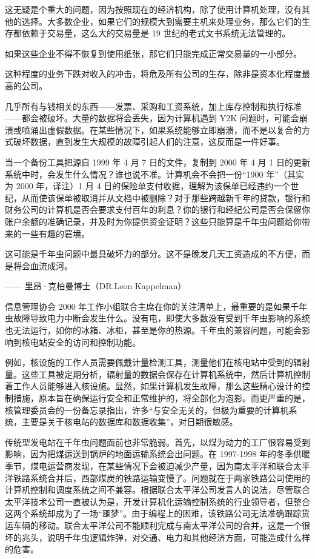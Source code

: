 这无疑是个重大的问题，因为按照现在的经济机构，除了使用计算机处理，没有其他的选择。大多数企业，如果它们的规模大到需要主机来处理业务，那么它们的生存都依赖于交易量，这么大的交易量是 19 世纪的老式文书系统无法管理的。


如果这些企业不得不恢复到使用纸张，那它们只能完成正常交易量的一小部分。


这种程度的业务下跌对收入的冲击，将危及所有公司的生存，除非是资本化程度最高的公司。


几乎所有与钱相关的东西——发票、采购和工资系统，加上库存控制和执行标准——都会被破坏。大量的数据将会丢失，因为计算机遇到 Y2K 问题时，可能会崩溃或喷涌出虚假数据。在某些情况下，如果系统能够立即崩溃，而不是以复合的方式破坏数据，直到发生大规模的故障引起人们的注意，这反而是一件好事。


当一个备份工具把源自 1999 年 4 月 7 日的文件，复制到 2000 年 4 月 1 日的更新系统中时，会发生什么情况？谁也说不准。计算机会不会把一份“1900 年”（其实为 2000 年，译注）1 月 4 日的保险单支付收据，理解为该保单已经违约一个世纪，从而使该保单被取消并从文档中被删除？对于那些跨越新千年的贷款，银行和财务公司的计算机是否会要求支付百年的利息？你的银行和经纪公司是否会保留你账户余额的准确记录，并及时为你提供资金证明？这些只能算是千年虫问题给你带来的一些有趣的窘境。


\begin{tcolorbox}
这可能是千年虫问题中最具破坏力的部分。这不是晚发几天工资造成的不方便，而是将会血流成河。
\begin{flushright}
—— 里昂·克柏曼博士（DR.Leon Kappelman）
\end{flushright}
\end{tcolorbox}

信息管理协会 2000 年工作小组联合主席在你的关注清单上，最重要的是如果千年虫故障导致电力中断会发生什么。没有电，即使大多数没有受到千年虫影响的系统也无法运行，如你的冰箱、冰柜，甚至是你的热源。千年虫的兼容问题，可能会影响到核电站安全的访问和控制功能。


例如，核设施的工作人员需要佩戴计量检测工具，测量他们在核电站中受到的辐射量。这些工具被定期分析，辐射量的数据会保存在计算机系统中，然后计算机控制着工作人员能够进入核设施。显然，如果计算机发生故障，那么这些精心设计的控制措施，原本旨在确保运行安全和正常维护的，将全部化为泡影。而更严重的是，核管理委员会的一份备忘录指出，许多“与安全无关的，但极为重要的计算机系统，主要是关于核电站的数据库和数据收集”，对日期很敏感。


传统型发电站在千年虫问题面前也非常脆弱。首先，以煤为动力的工厂很容易受到影响，因为把煤运送到锅炉的地面运输系统会出问题。在 1997-1998 年的冬季供暖季节，煤电运营商发现，在某些情况下会被迫减少产量，因为南太平洋和联合太平洋铁路系统合并后，西部煤炭的铁路运输变慢了。问题就在于两家铁路公司使用的计算机控制和调度系统之间不兼容。根据联合太平洋公司发言人的说法，尽管联合太平洋技术公司一直被认为是，开发计算机化运输控制系统的行业领导者，但整合这两个系统却成为了一场“噩梦”。由于编程上的困难，该铁路公司无法准确跟踪货运车辆的移动。联合太平洋公司不能顺利完成与南太平洋公司的合并，这是一个很坏的兆头，说明千年虫逻辑炸弹，对交通、电力和其他经济方面，可能造成什么样的危害。


